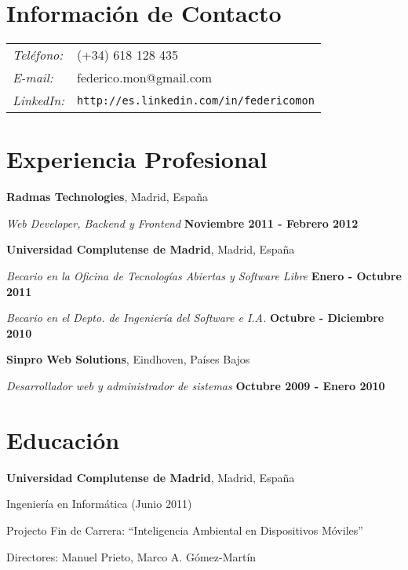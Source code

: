 \documentclass[margin,line]{resume}
\begin{document}
\address{Ingeniero en Informática}

\begin{resume}
\section{\sc Información de Contacto}
\vspace{.05in}
\begin{tabular}{@{}p{0.5in}p{2in}}
{\it Teléfono:} &(+34) 618 128 435 \\
{\it E-mail:} &{ federico.mon@gmail.com}\\
{\it LinkedIn:} &{ \tt http://es.linkedin.com/in/federicomon}\\
\end{tabular}

\section{\sc Experiencia Profesional}
{\bf Radmas Technologies}, Madrid, España

\vspace{-.3cm}
{\em Web Developer, Backend y Frontend} \hfill
{\bf Noviembre 2011 - Febrero 2012
}

{\bf Universidad Complutense de Madrid}, Madrid, España

\vspace{-.3cm}
{\em Becario en la Oficina de Tecnologías Abiertas y Software Libre} \hfill
{\bf Enero - Octubre 2011
}

\vspace{-.3cm}
{\em Becario en el Depto. de Ingeniería del Software e I.A.} \hfill {\bf Octubre -
Diciembre 2010}


{\bf Sinpro Web Solutions}, Eindhoven, Países Bajos

\vspace{-.3cm}
{\em Desarrollador web y administrador de sistemas} \hfill {\bf Octubre 2009 -
Enero 2010}

\section{\sc Educación}
{\bf Universidad Complutense de Madrid}, Madrid, España\\
\vspace*{-.1in}
\begin{list1}
\item[] Ingeniería en Informática (Junio 2011)
\begin{list2}
\vspace*{.05in}
\item Projecto Fin de Carrera:  ``Inteligencia Ambiental en Dispositivos Móviles'' 
\item Directores:  Manuel Prieto, Marco A. Gómez-Martín
\end{list2}
\end{list1}



\end{resume}
\end{document}

